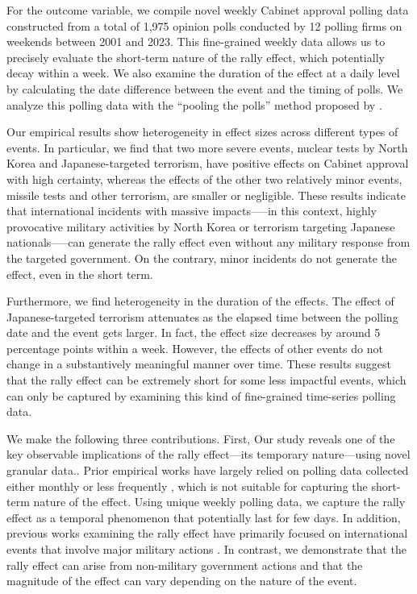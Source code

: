 \documentclass[letterpaper,12pt]{scrartcl}
\begin{document}
For the outcome variable, we compile novel weekly Cabinet approval polling data constructed from a total of 1,975 opinion polls conducted by 12 polling firms on weekends between 2001 and 2023. This fine-grained weekly data allows us to precisely evaluate the short-term nature of the rally effect, which potentially decay within a week. We also examine the duration of the effect at a daily level by calculating the date difference between the event and the timing of polls. We analyze this polling data with the ``pooling the polls'' method proposed by \citet{Jackman2005AustJPolitSci}.

Our empirical results show heterogeneity in effect sizes across different types of events. In particular, we find that two more severe events, nuclear tests by North Korea and Japanese-targeted terrorism, have positive effects on Cabinet approval with high certainty, whereas the effects of the other two relatively minor events, missile tests and other terrorism, are smaller or negligible. These results indicate that international incidents with massive impacts—--in this context, highly provocative military activities by North Korea or terrorism targeting Japanese nationals—--can generate the rally effect even without any military response from the targeted government. On the contrary, minor incidents do not generate the effect, even in the short term.

Furthermore, we find heterogeneity in the duration of the effects. The effect of Japanese-targeted terrorism attenuates as the elapsed time between the polling date and the event gets larger. In fact, the effect size decreases by around 5 percentage points within a week. However, the effects of other events do not change in a substantively meaningful manner over time. These results suggest that the rally effect can be extremely short for some less impactful events, which can only be captured by examining this kind of fine-grained time-series polling data.

We make the following three contributions. First, Our study reveals one of the key observable implications of the rally effect---its temporary nature---using novel granular data.. Prior empirical works have largely relied on polling data collected either monthly \citep{marra1990,Parker1995POQ,Baker2001JCR,Lai2005ISQ} or less frequently \citep{lee1977,Kam2008POQ}, which is not suitable for capturing the short-term nature of the effect. Using unique weekly polling data, we capture the rally effect as a temporal phenomenon that potentially last for few days. In addition, previous works examining the rally effect have primarily focused on international events that involve major military actions \citep[e.g.,][]{oneal1996,Lai2005ISQ}. In contrast, we demonstrate that the rally effect can arise from non-military government actions and that the magnitude of the effect can vary depending on the nature of the event.
\end{document}
